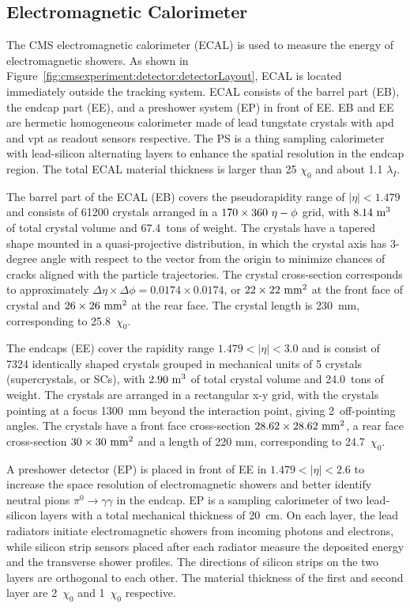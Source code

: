 \subsection{Electromagnetic Calorimeter}
The CMS electromagnetic calorimeter (ECAL) \cite{cms:ecalTdr:CMS:1997ysd} is used to measure the energy of electromagnetic showers. As shown in Figure~\ref{fig:cmsexperiment:detector:detectorLayout}, ECAL is located immediately outside the tracking system. ECAL consists of the barrel part (EB), the endcap part (EE), and a preshower system (EP) in front of EE. EB and EE are hermetic homogeneous calorimeter made of lead tungstate crystals with \acrfull{apd} and \acrfull{vpt} as readout sensors respective. The PS is a thing sampling calorimeter with lead-silicon alternating layers to enhance the spatial resolution in the endcap region. The total ECAL material thickness is larger than 25 $\chi_0$ and about 1.1 $\lambda_I$.

The barrel part of the ECAL (EB) covers the pseudorapidity range of $|\eta|< 1.479$ and consists of 61200 crystals arranged in a $\rm 170\times360 ~ \eta - \phi$ grid, with $\rm 8.14~m^3$ of total crystal volume and 67.4~tons of weight. The crystals have a tapered shape mounted in a quasi-projective distribution, in which the crystal axis has 3-degree angle with respect to the vector from the origin to minimize chances of cracks aligned with the particle trajectories. The crystal cross-section corresponds to approximately $\Delta \eta \times \Delta\phi = 0.0174 \times 0.0174$, or $\rm 22 \times 22 ~ mm^2$ at the front face of crystal and $\rm 26\times26 ~ mm^2$ at the rear face. The crystal length is 230~mm, corresponding to 25.8~$\chi_0$.

The endcaps (EE) cover the rapidity range $1.479 < |\eta| < 3.0$ and is consist of 7324 identically shaped crystals grouped in mechanical units of 5 crystals (supercrystals, or SCs), with $\rm 2.90~m^3$ of total crystal volume and 24.0~tons of weight. The crystals are arranged in a rectangular x-y grid, with the crystals pointing at a focus 1300~mm beyond the interaction point, giving 2\textdegree ~off-pointing angles. The crystals have a front face cross-section $\rm 28.62\times28.62 ~mm^2$, a rear face cross-section $\rm 30\times30~mm^2$ and a length of 220 mm, corresponding to 24.7~$\chi_0$.

A preshower detector (EP) is placed in front of EE in $1.479 < |\eta| < 2.6$ to increase the space resolution of electromagnetic showers and better identify neutral pions $\pi^0 \to \gamma \gamma$ in the endcap. EP is a sampling calorimeter of two lead-silicon layers with a total mechanical thickness of 20~cm. On each layer, the lead radiators initiate electromagnetic showers from incoming photons and electrons, while silicon strip sensors placed after each radiator measure the deposited energy and the transverse shower profiles. The directions of silicon strips on the two layers are orthogonal to each other. The material thickness of the first and second layer are 2~$\chi_0$ and 1~$\chi_0$ respective.



